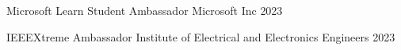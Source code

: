 \begin{cvhonors}

  \cvhonor
  {Microsoft Learn Student Ambassador} %
  {Microsoft Inc} %
  {} %
  {2023} %

  \cvhonor
  {IEEEXtreme Ambassador} %
  {Institute of Electrical and Electronics Engineers} %
  {}
  {2023} %



\end{cvhonors}

